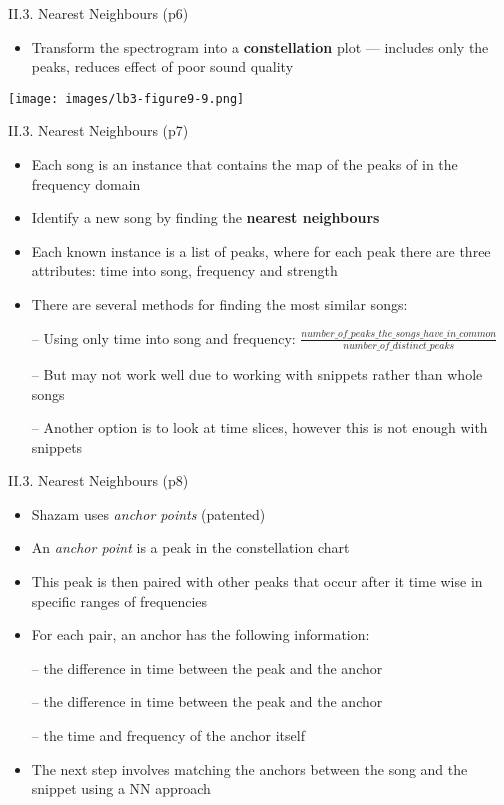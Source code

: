 \documentclass[handout]{beamer}
\newcommand{\strong}[1]{\textbf{\color{teal} #1}}
\begin{document}
\begin{frame}{II.3. Nearest Neighbours (p6)}
\begin{itemize}
\item Transform the spectrogram into a \strong{constellation} plot --- includes only the peaks, reduces effect of poor sound quality
\end{itemize}
\begin{center}
\texttt{[image: images/lb3-figure9-9.png]}\\
\cite[Figure 9.9]{LB3:2011}
\end{center}
\end{frame}
\begin{frame}{II.3. Nearest Neighbours (p7)}
\begin{itemize}
\item Each song is an instance that contains the map of the peaks of in the frequency domain
\item Identify a new song by finding the \strong{nearest neighbours}
\item Each known instance is a list of peaks, where for each peak there are three attributes: time into song, frequency and strength
\item There are several methods for finding the most similar songs:
\item[--] Using only time into song and frequency: 
$\frac{number\_of\_peaks\_the\_songs\_have\_in\_common}{number\_of\_distinct\_peaks}$
\item[--] But may not work well due to working with snippets rather than whole songs
\item[--] Another option is to look at time slices, however this is not enough with snippets
\end{itemize}
\end{frame}
\begin{frame}{II.3. Nearest Neighbours (p8)}
\begin{itemize}
\item Shazam uses \emph{anchor points} (patented)
\item An \emph{anchor point} is a peak in the constellation chart
\item This peak is then paired with other peaks that occur after it time wise in specific ranges of frequencies
\item For each pair, an anchor has the following information:
\item[--] the difference in time between the peak and the anchor
\item[--] the difference in time between the peak and the anchor
\item[--] the time and frequency of the anchor itself
\item The next step involves matching the anchors between the song and the snippet using a NN approach
\end{itemize}
\end{frame}
\end{document}
